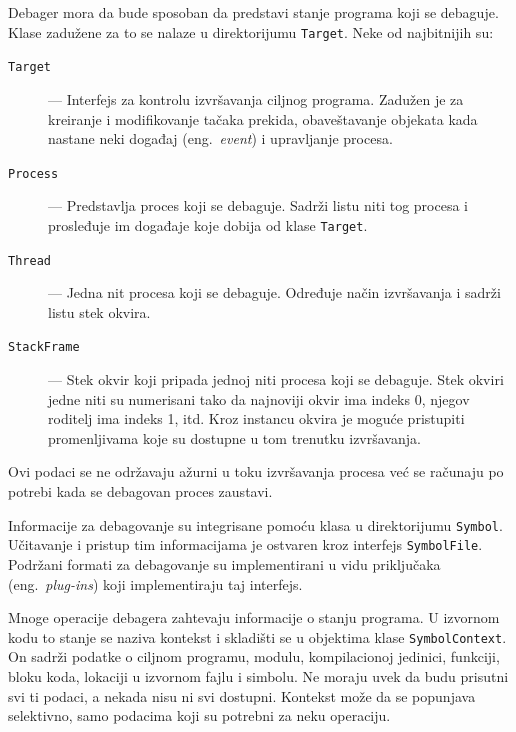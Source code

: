 \documentclass[12pt,oneside]{memoir}
\begin{document}
Debager mora da bude sposoban da predstavi stanje programa koji se debaguje.
Klase zadužene za to se nalaze u direktorijumu \verb|Target|.
Neke od najbitnijih su:
\begin{description}
  \item[\texttt{Target}] --- Interfejs za kontrolu izvršavanja ciljnog programa. Zadužen je za kreiranje i modifikovanje tačaka prekida, obaveštavanje objekata kada nastane neki događaj (eng.~{\em event}) i upravljanje procesa.
  \item[\texttt{Process}] --- Predstavlja proces koji se debaguje. Sadrži listu niti tog procesa i prosleđuje im događaje koje dobija od klase \verb|Target|.
  \item[\texttt{Thread}] --- Jedna nit procesa koji se debaguje. Određuje način izvršavanja i sadrži listu stek okvira.
  \item[\texttt{StackFrame}] --- Stek okvir koji pripada jednoj niti procesa koji se debaguje. Stek okviri jedne niti su numerisani tako da najnoviji okvir ima indeks 0, njegov roditelj ima indeks 1, itd. Kroz instancu okvira je moguće pristupiti promenljivama koje su dostupne u tom trenutku izvršavanja.
\end{description}
Ovi podaci se ne održavaju ažurni u toku izvršavanja procesa već se računaju po potrebi kada se debagovan proces zaustavi.

Informacije za debagovanje su integrisane pomoću klasa u direktorijumu \verb|Symbol|.
Učitavanje i pristup tim informacijama je ostvaren kroz interfejs \verb|SymbolFile|.
Podržani formati za debagovanje su implementirani u vidu priključaka (eng.~{\em plug-ins}) koji implementiraju taj interfejs.

Mnoge operacije debagera zahtevaju informacije o stanju programa.
U izvornom kodu to stanje se naziva kontekst i skladišti se u objektima klase \verb|SymbolContext|.
On sadrži podatke o ciljnom programu, modulu, kompilacionoj jedinici, funkciji, bloku koda, lokaciji u izvornom fajlu i simbolu.
Ne moraju uvek da budu prisutni svi ti podaci, a nekada nisu ni svi dostupni.
Kontekst može da se popunjava selektivno, samo podacima koji su potrebni za neku operaciju.
\end{document}
